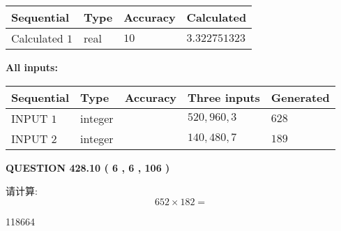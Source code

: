 \documentclass{ctexart}
\begin{document}
   
   
   
\noindent{}
   
   
  
  
\noindent\begin{tabular}{|l|l|l|l|}
\hline
 Sequential & Type & Accuracy & Calculated \\ 
\hline
 
 
  Calculated $  1 $ & real & $  10  $ & 
 $ 3.322751323 $ 
 \\  \hline  
 \end{tabular}
   
   
   
   
\noindent\vspace{0.1in}\hspace{-0.08in} {\textbf{\Large{All inputs: }}}
   
   
  
  
\noindent\begin{tabular}{|l|l|l|l|l|}
\hline
 Sequential & Type & Accuracy & Three inputs & Generated \\ 
\hline
 
 
  INPUT $  1 $ & integer &  & $
 520
 , 
 960
 , 
 3
 $ & $ 628 $ 
 \\  \hline  
 
 
  INPUT $  2 $ & integer &  & $
 140
 , 
 480
 , 
 7
 $ & $ 189 $ 
 \\  \hline  
 \end{tabular}
   
   
  
\vspace{0.2in}
  
{\textbf{\Large{QUESTION
428.10 
 ( 6 , 6 , 106 )
}}}
  
  
 
请计算:
\begin{equation}
652  \times    %
182 = \nonumber
\end{equation}
 
 
 
\noindent{}
 
 

118664
 
 
\noindent{}
 
 

 
 
 
\noindent{}
 
\end{document}
